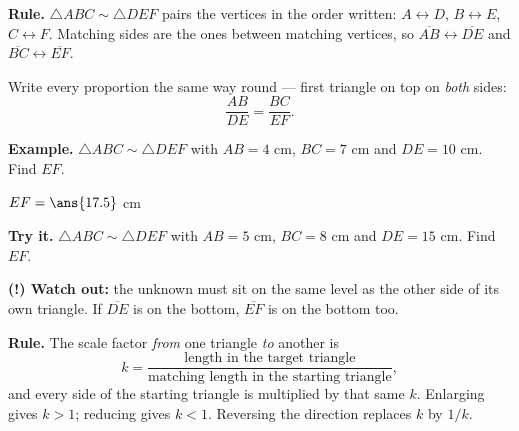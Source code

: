 \documentclass[12pt]{article}
\begin{document}


\begin{formulabox}
\textbf{Rule.} $\triangle ABC \sim \triangle DEF$ pairs the vertices in the
order written: $A \leftrightarrow D$, $B \leftrightarrow E$,
$C \leftrightarrow F$. Matching sides are the ones between matching vertices,
so $\overline{AB} \leftrightarrow \overline{DE}$ and
$\overline{BC} \leftrightarrow \overline{EF}$.\par
Write every proportion the same way round --- first triangle on top on
\emph{both} sides:
\[ \frac{AB}{DE} = \frac{BC}{EF}. \]
\end{formulabox}

\begin{examplebox}
\textbf{Example.} $\triangle ABC \sim \triangle DEF$ with $AB = 4$ cm,
$BC = 7$ cm and $DE = 10$ cm. Find $EF$.

$EF = \ans{17.5}$ cm
\end{examplebox}

\begin{tryitbox}
\textbf{Try it.} $\triangle ABC \sim \triangle DEF$ with $AB = 5$ cm,
$BC = 8$ cm and $DE = 15$ cm. Find $EF$.\\[2pt]
\end{tryitbox}

\begin{watchoutbox}
\textbf{(!) Watch out:} the unknown must sit on the same level as the other side
of its own triangle. If $\overline{DE}$ is on the bottom, $\overline{EF}$ is on
the bottom too.
\end{watchoutbox}


\begin{formulabox}
\textbf{Rule.} The scale factor \emph{from} one triangle \emph{to} another is
\[ k = \frac{\text{length in the target triangle}}{\text{matching length in the starting triangle}}, \]
and every side of the starting triangle is multiplied by that same $k$.
Enlarging gives $k > 1$; reducing gives $k < 1$. Reversing the direction
replaces $k$ by $1/k$.
\end{formulabox}
\end{document}
